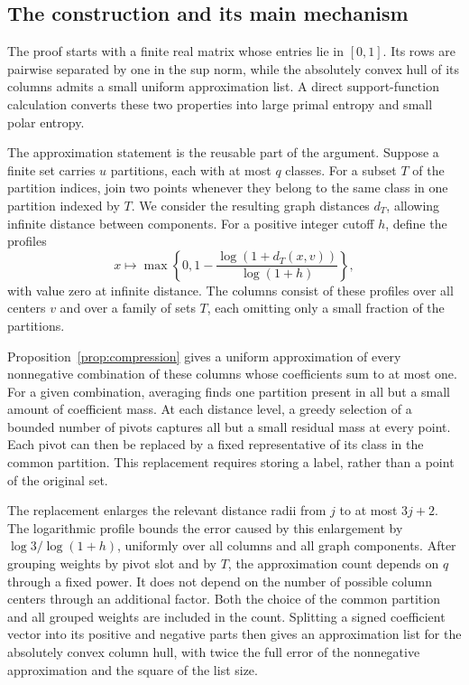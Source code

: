 \subsection{The construction and its main mechanism}

The proof starts with a finite real matrix whose entries lie in $[0,1]$.
Its rows are pairwise separated by one in the sup norm, while the
absolutely convex hull of its columns admits a small uniform
approximation list. A direct support-function calculation converts
these two properties into large primal entropy and small polar entropy.

The approximation statement is the reusable part of the argument.
Suppose a finite set carries $u$ partitions, each with at most $q$ classes.
For a subset $T$ of the partition indices, join two points whenever they
belong to the same class in one partition indexed by $T$. We consider
the resulting graph distances $d_T$, allowing infinite distance between
components. For a positive integer cutoff $h$, define the profiles
\[
 x\longmapsto
 \max\left\{0,1-\frac{\log(1+d_T(x,v))}{\log(1+h)}\right\},
\]
with value zero at infinite distance.
The columns consist of these profiles over all centers $v$ and over a
family of sets $T$, each omitting only a small fraction of the partitions.

Proposition~\ref{prop:compression} gives a uniform approximation of
every nonnegative combination of these columns whose coefficients sum
to at most one. For a given combination,
averaging finds one partition present in all but a small amount of
coefficient mass. At each distance level, a greedy selection of a bounded
number of pivots captures all but a small residual mass at every point.
Each pivot can then be replaced by a fixed representative of its class
in the common partition. This replacement requires storing a label,
rather than a point of the original set.

The replacement enlarges the relevant distance radii from $j$ to at
most $3j+2$. The logarithmic profile bounds the error caused by this enlargement
by $\log3/\log(1+h)$, uniformly over all columns and all graph
components. After grouping weights by pivot slot and by $T$, the
approximation count depends on $q$ through a fixed power. It does not
depend on the number of possible column centers through an additional
factor. Both the choice of the common partition and all grouped
weights are included in the count. Splitting a signed coefficient vector
into its positive and negative parts then gives an approximation list
for the absolutely convex column hull, with twice the full error of the nonnegative
approximation and the square of the list size.

